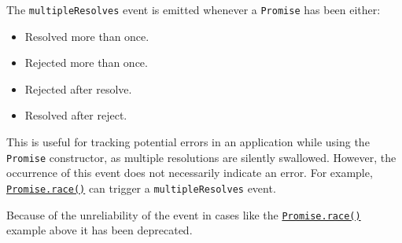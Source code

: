 The \texttt{\textquotesingle{}multipleResolves\textquotesingle{}} event
is emitted whenever a \texttt{Promise} has been either:

\begin{itemize}
\tightlist
\item
  Resolved more than once.
\item
  Rejected more than once.
\item
  Rejected after resolve.
\item
  Resolved after reject.
\end{itemize}

This is useful for tracking potential errors in an application while
using the \texttt{Promise} constructor, as multiple resolutions are
silently swallowed. However, the occurrence of this event does not
necessarily indicate an error. For example,
\href{https://developer.mozilla.org/en-US/docs/Web/JavaScript/Reference/Global_Objects/Promise/race}{\texttt{Promise.race()}}
can trigger a
\texttt{\textquotesingle{}multipleResolves\textquotesingle{}} event.

Because of the unreliability of the event in cases like the
\href{https://developer.mozilla.org/en-US/docs/Web/JavaScript/Reference/Global_Objects/Promise/race}{\texttt{Promise.race()}}
example above it has been deprecated.

